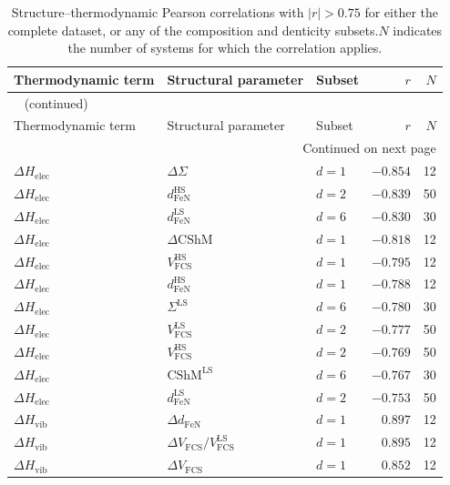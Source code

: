 \begingroup
\small
\setlength{\tabcolsep}{7pt}
\begin{longtable}{@{}lllrr@{}}
\caption{Structure--thermodynamic Pearson correlations with $|r|>0.75$ for either the complete dataset, or any of the composition and denticity subsets.$N$ indicates the number of systems for which the correlation applies.}
\label{tab:strong-structural-correlations}\\
\toprule
Thermodynamic term & Structural parameter & Subset & $r$ & $N$ \\
\midrule
\endfirsthead
\multicolumn{5}{l}{\tablename~\thetable{} (continued)}\\
\toprule
Thermodynamic term & Structural parameter & Subset & $r$ & $N$ \\
\midrule
\endhead
\midrule
\multicolumn{5}{r}{Continued on next page}\\
\endfoot
\bottomrule
\endlastfoot
$\Delta H_{\mathrm{elec}}$ & $\Delta\Sigma$ & $d=1$ & $-0.854$ & 12 \\
$\Delta H_{\mathrm{elec}}$ & $d_{\mathrm{FeN}}^{\mathrm{HS}}$ & $d=2$ & $-0.839$ & 50 \\
$\Delta H_{\mathrm{elec}}$ & $d_{\mathrm{FeN}}^{\mathrm{LS}}$ & $d=6$ & $-0.830$ & 30 \\
$\Delta H_{\mathrm{elec}}$ & $\Delta\mathrm{CShM}$ & $d=1$ & $-0.818$ & 12 \\
$\Delta H_{\mathrm{elec}}$ & $V_{\mathrm{FCS}}^{\mathrm{HS}}$ & $d=1$ & $-0.795$ & 12 \\
$\Delta H_{\mathrm{elec}}$ & $d_{\mathrm{FeN}}^{\mathrm{HS}}$ & $d=1$ & $-0.788$ & 12 \\
$\Delta H_{\mathrm{elec}}$ & $\Sigma^{\mathrm{LS}}$ & $d=6$ & $-0.780$ & 30 \\
$\Delta H_{\mathrm{elec}}$ & $V_{\mathrm{FCS}}^{\mathrm{LS}}$ & $d=2$ & $-0.777$ & 50 \\
$\Delta H_{\mathrm{elec}}$ & $V_{\mathrm{FCS}}^{\mathrm{HS}}$ & $d=2$ & $-0.769$ & 50 \\
$\Delta H_{\mathrm{elec}}$ & $\mathrm{CShM}^{\mathrm{LS}}$ & $d=6$ & $-0.767$ & 30 \\
$\Delta H_{\mathrm{elec}}$ & $d_{\mathrm{FeN}}^{\mathrm{LS}}$ & $d=2$ & $-0.753$ & 50 \\
\midrule
$\Delta H_{\mathrm{vib}}$ & $\Delta d_{\mathrm{FeN}}$ & $d=1$ & $0.897$ & 12 \\
$\Delta H_{\mathrm{vib}}$ & $\Delta V_{\mathrm{FCS}}/V_{\mathrm{FCS}}^{\mathrm{LS}}$ & $d=1$ & $0.895$ & 12 \\
$\Delta H_{\mathrm{vib}}$ & $\Delta V_{\mathrm{FCS}}$ & $d=1$ & $0.852$ & 12 \\

\end{longtable}
